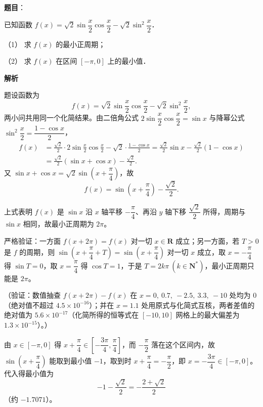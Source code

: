 \begin{answer}

\textbf{题目}：

已知函数 \(f(x)=\sqrt{2}\sin\dfrac{x}{2}\cos\dfrac{x}{2}-\sqrt{2}\sin^{2}\dfrac{x}{2}\)．

（1） 求 \(f(x)\) 的最小正周期；

（2） 求 \(f(x)\) 在区间 \([-\pi,0]\) 上的最小值．

\textbf{解析}

题设函数为
\nopagebreak[4]
\[
f(x)=\sqrt{2}\sin\frac{x}{2}\cos\frac{x}{2}-\sqrt{2}\sin^{2}\frac{x}{2},
\]
两小问共用同一个化简结果。由二倍角公式 \(2\sin\dfrac{x}{2}\cos\dfrac{x}{2}=\sin x\) 与降幂公式 \(\sin^{2}\dfrac{x}{2}=\dfrac{1-\cos x}{2}\)，
\nopagebreak[4]
\[
\begin{aligned}
f(x)&=\frac{\sqrt{2}}{2}\cdot2\sin\frac{x}{2}\cos\frac{x}{2}-\sqrt{2}\cdot\frac{1-\cos x}{2}=\frac{\sqrt{2}}{2}\sin x-\frac{\sqrt{2}}{2}(1-\cos x)\\
&=\frac{\sqrt{2}}{2}(\sin x+\cos x)-\frac{\sqrt{2}}{2}.
\end{aligned}
\]
又 \(\sin x+\cos x=\sqrt{2}\sin\left(x+\dfrac{\pi}{4}\right)\)，故
\nopagebreak[4]
\[
f(x)=\sin\left(x+\frac{\pi}{4}\right)-\frac{\sqrt{2}}{2}.
\]


上式表明 \(f(x)\) 是 \(\sin x\) 沿 \(x\) 轴平移 \(-\dfrac{\pi}{4}\)、再沿 \(y\) 轴下移 \(\dfrac{\sqrt{2}}{2}\) 所得，周期与 \(\sin x\) 相同，故最小正周期为 \(2\pi\)。

严格验证：一方面 \(f(x+2\pi)=f(x)\) 对一切 \(x\in\mathbf{R}\) 成立；另一方面，若 \(T>0\) 是 \(f\) 的周期，则 \(\sin\left(x+\dfrac{\pi}{4}+T\right)=\sin\left(x+\dfrac{\pi}{4}\right)\) 对一切 \(x\) 成立，取 \(x=-\dfrac{\pi}{4}\) 得 \(\sin T=0\)，取 \(x=\dfrac{\pi}{4}\) 得 \(\cos T=1\)，于是 \(T=2k\pi\ (k\in\mathbf{N}^{*})\)，最小正周期只能是 \(2\pi\)。

（验证：数值抽查 \(f(x+2\pi)-f(x)\) 在 \(x=0,\ 0.7,\ -2.5,\ 3.3,\ -10\) 处均为 \(0\)（绝对值不超过 \(4.5\times10^{-16}\)）；并在 \(x=1.1\) 处用原式与化简式互核，两者差值的绝对值为 \(5.6\times10^{-17}\)（化简所得的恒等式在 \([-10,10]\) 网格上的最大偏差为 \(1.3\times10^{-15}\)）。）


由 \(x\in[-\pi,0]\) 得 \(x+\dfrac{\pi}{4}\in\left[-\dfrac{3\pi}{4},\dfrac{\pi}{4}\right]\)，而 \(-\dfrac{\pi}{2}\) 落在这个区间内，故 \(\sin\left(x+\dfrac{\pi}{4}\right)\) 能取到最小值 \(-1\)，取到时 \(x+\dfrac{\pi}{4}=-\dfrac{\pi}{2}\)，即 \(x=-\dfrac{3\pi}{4}\in[-\pi,0]\)。代入得最小值为
\nopagebreak[4]
\[
-1-\frac{\sqrt{2}}{2}=-\frac{2+\sqrt{2}}{2}
\]
（约 \(-1.7071\)）。


\end{answer}
